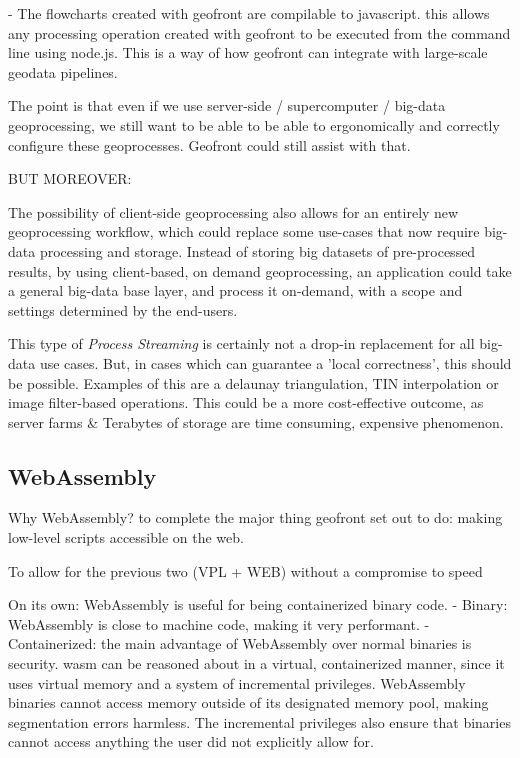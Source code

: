 - The flowcharts created with geofront are compilable to javascript. this allows any processing operation created with geofront to be executed from the command line using node.js. This is a way of how geofront can integrate with large-scale geodata pipelines. 

The point is that even if we use server-side / supercomputer / big-data geoprocessing, we still want to be able to be able to ergonomically and correctly configure these geoprocesses. Geofront could still assist with that.

BUT MOREOVER:

The possibility of client-side geoprocessing also allows for an entirely new geoprocessing workflow, which could replace some use-cases that now require big-data processing and storage. Instead of storing big datasets of pre-processed results, by using client-based, on demand geoprocessing, an application could take a general big-data base layer, and process it on-demand, with a scope and settings determined by the end-users. 

This type of \emph{Process Streaming} is certainly not a drop-in replacement for all big-data use cases. But, in cases which can guarantee a 'local correctness', this should be possible. Examples of this are a delaunay triangulation, TIN interpolation or image filter-based operations. This could be a more cost-effective outcome, as server farms \& Terabytes of storage are time consuming, expensive phenomenon.

\subsection{WebAssembly}

Why WebAssembly? to complete the major thing geofront set out to do: making low-level scripts accessible on the web. 

To allow for the previous two (VPL + WEB) without a compromise to speed

On its own: WebAssembly is useful for being containerized binary code. 
- Binary: WebAssembly is close to machine code, making it very performant.
- Containerized: the main advantage of WebAssembly over normal binaries is security. wasm can be reasoned about in a virtual, containerized manner, since it uses virtual memory and a system of incremental privileges. WebAssembly binaries cannot access memory outside of its designated memory pool, making segmentation errors harmless. The incremental privileges also ensure that binaries cannot access anything the user did not explicitly allow for. 

